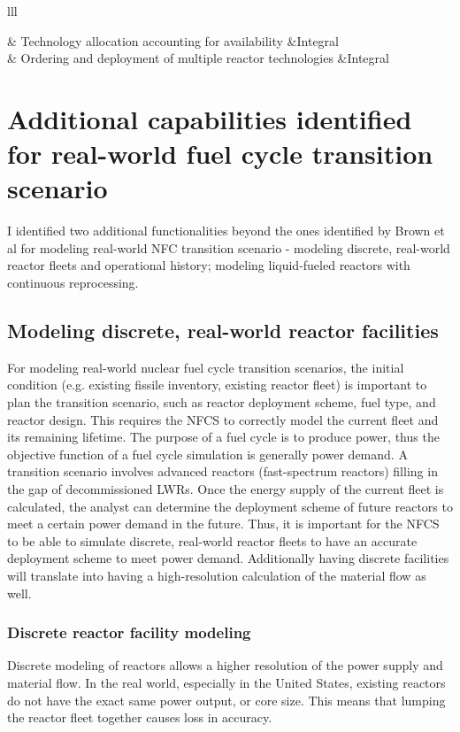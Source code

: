 \begin{table}[h]
\begin{tabular}{lll}
        \hline

         & Technology allocation accounting for availability &Integral \\
        	& Ordering and deployment of multiple reactor technologies &Integral \\
        \hline
    \end{tabular}
\end{table}

\section{Additional capabilities identified for real-world fuel cycle transition scenario}
I identified two additional functionalities beyond the ones identified by Brown et al \cite{brown_identification_2016}
for modeling real-world \gls{NFC} transition scenario -
modeling discrete, real-world reactor fleets and operational history; modeling liquid-fueled
reactors with continuous reprocessing.

\subsection{Modeling discrete, real-world reactor facilities}
For modeling real-world nuclear fuel cycle transition scenarios, the initial
condition (e.g. existing fissile inventory, existing reactor fleet) is important
to plan the transition scenario, such as reactor deployment
scheme, fuel type, and reactor design. This requires the \gls{NFCS} to correctly model the current fleet and its
remaining lifetime. The purpose of a fuel cycle is to produce power, thus the objective
function of a fuel cycle simulation is generally power demand. A transition
scenario involves advanced reactors (fast-spectrum reactors) filling in the
gap of decommissioned \glspl{LWR}.
Once the energy supply of the current fleet is calculated,
the analyst can determine the deployment scheme of future reactors to meet a certain
power demand in the future. Thus, it is important for the \gls{NFCS} to be able to simulate
discrete, real-world reactor fleets to have an accurate deployment scheme to
meet power demand. Additionally having discrete facilities will translate into
having a high-resolution calculation of the material flow as well.

\subsubsection{Discrete reactor facility modeling}
Discrete modeling of reactors allows a higher resolution of the power supply and
material flow. In the real world, especially in the United States, existing
reactors do not have the exact same power output, or core size. This means that
lumping the reactor fleet together causes loss in accuracy.

